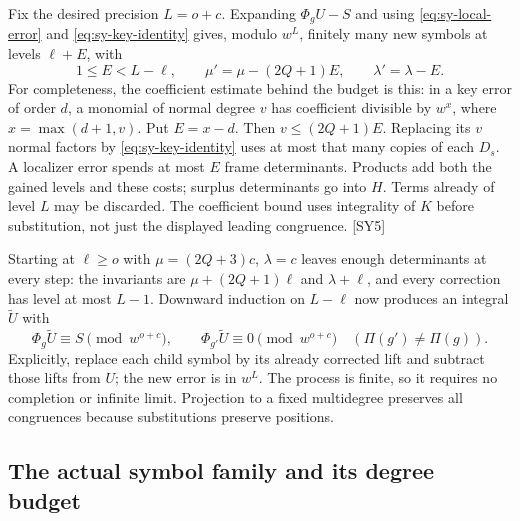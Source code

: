 \documentclass[11pt,a4paper]{article}
\numberwithin{equation}{section}
\theoremstyle{remark}\newtheorem{remark}[theorem]{Remark}
\begin{document}
Fix the desired precision $L=o+c$. Expanding $\Phi_gU-S$ and using \eqref{eq:sy-local-error} and \eqref{eq:sy-key-identity} gives, modulo $w^L$, finitely many new symbols at levels $\ell+E$, with
\begin{equation}\label{eq:sy-spares}
1\le E<L-\ell,\qquad
\mu'=\mu-(2Q+1)E,\qquad \lambda'=\lambda-E.
\end{equation}
For completeness, the coefficient estimate behind the budget is this: in a key error of order $d$, a monomial of normal degree $v$ has coefficient divisible by $w^x$, where $x=\max(d+1,v)$. Put $E=x-d$. Then $v\le(2Q+1)E$. Replacing its $v$ normal factors by \eqref{eq:sy-key-identity} uses at most that many copies of each $D_s$. A localizer error spends at most $E$ frame determinants. Products add both the gained levels and these costs; surplus determinants go into $H$. Terms already of level $L$ may be discarded. The coefficient bound uses integrality of $K$ before substitution, not just the displayed leading congruence. \textsf{[SY5]}

Starting at $\ell\ge o$ with $\mu=(2Q+3)c$, $\lambda=c$ leaves enough determinants at every step: the invariants are $\mu+(2Q+1)\ell$ and $\lambda+\ell$, and every correction has level at most $L-1$. Downward induction on $L-\ell$ now produces an integral $\widetilde U$ with
\[
\Phi_g\widetilde U\equiv S\pmod {w^{o+c}},\qquad
\Phi_{g'}\widetilde U\equiv0\pmod {w^{o+c}}\quad(\Pi(g')\ne\Pi(g)).
\]
Explicitly, replace each child symbol by its already corrected lift and subtract those lifts from $U$; the new error is in $w^L$. The process is finite, so it requires no completion or infinite limit. Projection to a fixed multidegree preserves all congruences because substitutions preserve positions.

\subsection{The actual symbol family and its degree budget}
\end{document}
